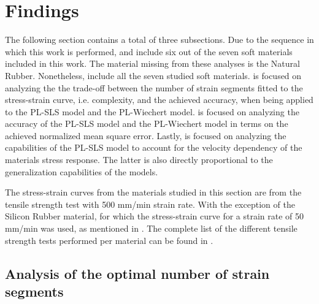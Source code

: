 \section{Findings}

The following section contains a total of three subsections. Due to the sequence in which this work is performed,  and  include six out of the seven soft materials included in this work. The material missing from these analyses is the Natural Rubber. Nonetheless,  include all the seven studied soft materials.
 is focused on analyzing the the trade-off between the number of strain segments fitted to the stress-strain curve, i.e. complexity, and the achieved accuracy, when being applied to the PL-SLS model and the PL-Wiechert model.  is focused on analyzing the accuracy of the PL-SLS model and the PL-Wiechert model in terms on the achieved normalized mean square error. Lastly,  is focused on analyzing the capabilities of the PL-SLS model to account for the velocity dependency of the materials stress response. The latter is also directly proportional to the generalization capabilities of the models. 

The stress-strain curves from the materials studied in this section are from the tensile strength test with 500 mm/min strain rate. With the exception of the Silicon Rubber material, for which the stress-strain curve for a strain rate of 50 mm/min was used, as mentioned in . The complete list of the different tensile strength tests performed per material can be found in .

\subsection{Analysis of the optimal number of strain segments} \label{SegmentAnalysis}


